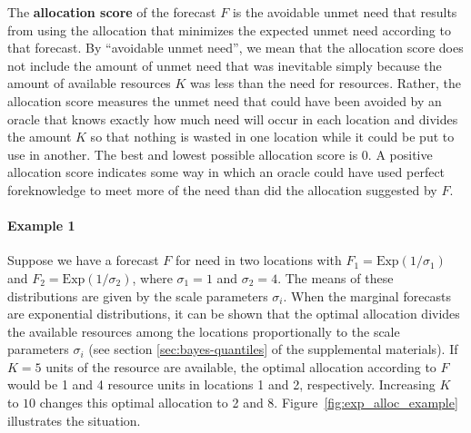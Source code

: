 \documentclass{article}\usepackage[]{graphicx}\usepackage[]{xcolor}
\begin{document}
The \textbf{allocation score} of the forecast $F$ is the avoidable unmet need that results from using the allocation
that minimizes the expected unmet need according to that forecast. By ``avoidable unmet need'', we mean that the
allocation score does not include the amount of unmet need that was inevitable simply because the amount of available
resources $K$ was less than the need for resources. Rather, the allocation score measures the unmet need that could have
been avoided by an oracle that knows exactly how much need will occur in each location and divides the amount $K$ so
that nothing is wasted in one location while it could be put to use in another. The best and lowest possible allocation 
score is 0.  A positive allocation score indicates some way in which an oracle could have used perfect foreknowledge to
meet more of the need than did the allocation suggested by $F$.

\paragraph{Example 1} Suppose we have a forecast $F$ for need in two locations with $F_1 = \mathrm{Exp}(1 / \sigma_1)$
and $F_2 = \mathrm{Exp}(1 / \sigma_2)$, where $\sigma_1 = 1$ and $\sigma_2 = 4$. The means of these distributions are
given by the scale parameters $\sigma_i$. When the marginal forecasts are exponential distributions, it can be shown
that the optimal allocation divides the available resources among the locations proportionally to the scale parameters
$\sigma_i$ (see section \ref{sec:bayes-quantiles} of the supplemental materials). If $K = 5$ units of the resource are
available, the optimal allocation according to $F$ would be 1 and 4 resource units in locations 1 and 2, respectively. 
Increasing $K$ to $10$ changes this optimal allocation to 2 and 8. Figure~\ref{fig:exp_alloc_example} illustrates the 
situation.
\end{document}
